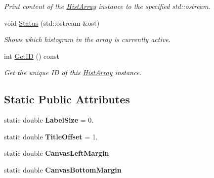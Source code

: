 \begin{DoxyCompactItemize}
\begin{DoxyCompactList}\small\item\em Print content of the \hyperlink{classHistArray}{Hist\+Array} instance to the specified std\+::ostream. \end{DoxyCompactList}\item 
\hypertarget{classHistArray_a1e56292db3641c5b80aaf0eb089b2d41}{}void \hyperlink{classHistArray_a1e56292db3641c5b80aaf0eb089b2d41}{Status} (std\+::ostream \&ost)\label{classHistArray_a1e56292db3641c5b80aaf0eb089b2d41}

\begin{DoxyCompactList}\small\item\em Shows which histogram in the array is currently active. \end{DoxyCompactList}\item 
\hypertarget{classHistArray_a5957d6ee5e35e9608adbfe39b6bac23c}{}int \hyperlink{classHistArray_a5957d6ee5e35e9608adbfe39b6bac23c}{Get\+I\+D} () const \label{classHistArray_a5957d6ee5e35e9608adbfe39b6bac23c}

\begin{DoxyCompactList}\small\item\em Get the unique I\+D of this \hyperlink{classHistArray}{Hist\+Array} instance. \end{DoxyCompactList}\end{DoxyCompactItemize}
\subsection*{Static Public Attributes}
\begin{DoxyCompactItemize}
\item 
\hypertarget{classHistArray_a845bfc93a180b366d44e8b24eb64a580}{}static double {\bfseries Label\+Size} = 0.\label{classHistArray_a845bfc93a180b366d44e8b24eb64a580}

\item 
\hypertarget{classHistArray_a01a6c76e60d235edbc672c7ce0fbb760}{}static double {\bfseries Title\+Offset} = 1.\label{classHistArray_a01a6c76e60d235edbc672c7ce0fbb760}

\item 
\hypertarget{classHistArray_a3b9428401fbbcf2ed333ac20ad65ef1a}{}static double {\bfseries Canvas\+Left\+Margin}\label{classHistArray_a3b9428401fbbcf2ed333ac20ad65ef1a}

\item 
\hypertarget{classHistArray_af651ef39b498decd7dda5550ef13f357}{}static double {\bfseries Canvas\+Bottom\+Margin}\label{classHistArray_af651ef39b498decd7dda5550ef13f357}

\end{DoxyCompactItemize}
